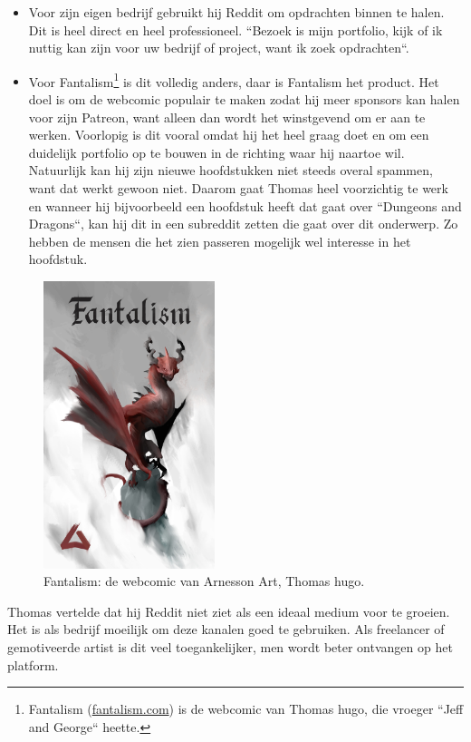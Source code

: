 \begin{itemize} 
	\item Voor zijn eigen bedrijf gebruikt hij Reddit om opdrachten binnen te halen. Dit is heel direct en heel professioneel. ``Bezoek is mijn portfolio, kijk of ik nuttig kan zijn voor uw bedrijf of project, want ik zoek opdrachten``.
	\item Voor Fantalism\footnote{Fantalism (\href{https://fantalism.com/}{fantalism.com}) is de webcomic van Thomas hugo, die vroeger ``Jeff and George`` heette.} is dit volledig anders, daar is Fantalism het product. Het doel is om de webcomic populair te maken zodat hij meer sponsors kan halen voor zijn Patreon, want alleen dan wordt het winstgevend om er aan te werken. Voorlopig is dit vooral omdat hij het heel graag doet en om een duidelijk portfolio op te bouwen in de richting waar hij naartoe wil. Natuurlijk kan hij zijn nieuwe hoofdstukken niet steeds overal spammen, want dat werkt gewoon niet. Daarom gaat Thomas heel voorzichtig te werk en wanneer hij bijvoorbeeld een hoofdstuk heeft dat gaat over ``Dungeons and Dragons``, kan hij dit in een subreddit zetten die gaat over dit onderwerp. Zo hebben de mensen die het zien passeren mogelijk wel interesse in het hoofdstuk.
\end{itemize} 
\begin{figure}[h!]
	\includegraphics[width=50mm,scale=0.5]{img/arnesson-art-fantalism.jpg}
	\centering
	\caption{Fantalism: de webcomic van Arnesson Art, Thomas hugo.}
	\label{fig:fantalism}
\end{figure}
Thomas vertelde dat hij Reddit niet ziet als een ideaal medium voor te groeien. Het is als bedrijf moeilijk om deze kanalen goed te gebruiken. Als freelancer of gemotiveerde artist is dit veel toegankelijker, men wordt beter ontvangen op het platform.
	

